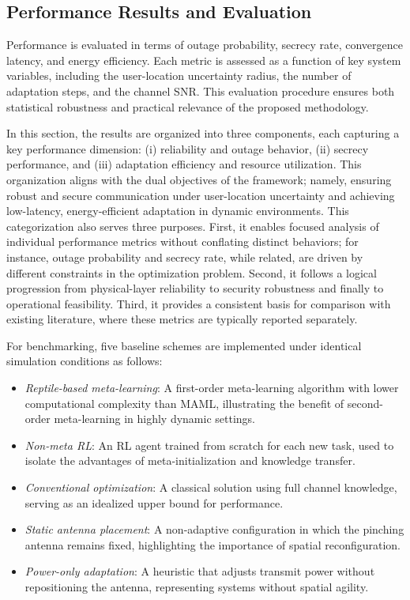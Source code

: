 \documentclass[journal,10pt]{IEEEtran}
\begin{document}




\subsection{Performance Results and Evaluation}
Performance is evaluated in terms of outage probability, secrecy rate, convergence latency, and energy efficiency. Each metric is assessed as a function of key system variables, including the user-location uncertainty radius, the number of adaptation steps, and the channel SNR. This evaluation procedure ensures both statistical robustness and practical relevance of the proposed methodology.

In this section, the results are organized into three components, each capturing a key performance dimension: (i) reliability and outage behavior, (ii) secrecy performance, and (iii) adaptation efficiency and resource utilization. This organization aligns with the dual objectives of the framework; namely, ensuring robust and secure communication under user-location uncertainty and achieving low-latency, energy-efficient adaptation in dynamic environments.
%
This categorization also serves three purposes. First, it enables focused analysis of individual performance metrics without conflating distinct behaviors; for instance, outage probability and secrecy rate, while related, are driven by different constraints in the optimization problem. Second, it follows a logical progression from physical-layer reliability to security robustness and finally to operational feasibility. Third, it provides a consistent basis for comparison with existing literature, where these metrics are typically reported separately.

For benchmarking, five baseline schemes are implemented under identical simulation conditions as follows:
\begin{itemize}
\item \textit{Reptile-based meta-learning}: A first-order meta-learning algorithm with lower computational complexity than MAML, illustrating the benefit of second-order meta-learning in highly dynamic settings.
\item \textit{Non-meta RL}: An RL agent trained from scratch for each new task, used to isolate the advantages of meta-initialization and knowledge transfer.
\item \textit{Conventional optimization}: A classical solution using full channel knowledge, serving as an idealized upper bound for performance.
\item \textit{Static antenna placement}: A non-adaptive configuration in which the pinching antenna remains fixed, highlighting the importance of spatial reconfiguration.
\item \textit{Power-only adaptation}: A heuristic that adjusts transmit power without repositioning the antenna, representing systems without spatial agility.
\end{itemize}
\end{document}
